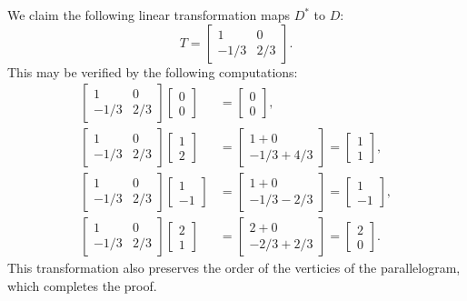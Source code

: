 \documentclass[11pt]{article}
\begin{document}
We claim the following linear transformation maps $D^{*}$ to $D$:
\[
	\boxed{T = \begin{bmatrix} 1 & 0 \\ -1/3 & 2/3 \end{bmatrix}}.
\]
This may be verified by the following computations:
\begin{align*}
	\begin{bmatrix} 1 & 0 \\ -1/3 & 2/3 \end{bmatrix} \begin{bmatrix} 0 \\ 0 \end{bmatrix} &= \begin{bmatrix} 0 \\ 0 \end{bmatrix}, \\
	\begin{bmatrix} 1 & 0 \\ -1/3 & 2/3 \end{bmatrix} \begin{bmatrix} 1 \\ 2 \end{bmatrix} &= \begin{bmatrix} 1 + 0 \\ -1/3 + 4/3 \end{bmatrix} = \begin{bmatrix} 1 \\ 1 \end{bmatrix}, \\
	\begin{bmatrix} 1 & 0 \\ -1/3 & 2/3 \end{bmatrix} \begin{bmatrix} 1 \\ -1 \end{bmatrix} &= \begin{bmatrix} 1 + 0 \\ -1/3 - 2/3 \end{bmatrix} = \begin{bmatrix} 1 \\ -1 \end{bmatrix}, \\
	\begin{bmatrix} 1 & 0 \\ -1/3 & 2/3 \end{bmatrix} \begin{bmatrix} 2 \\ 1 \end{bmatrix} &= \begin{bmatrix} 2 + 0 \\ -2/3 + 2/3 \end{bmatrix} = \begin{bmatrix} 2 \\ 0 \end{bmatrix}.
\end{align*}
This transformation also preserves the order of the verticies of the parallelogram, which completes the proof.
\end{document}
